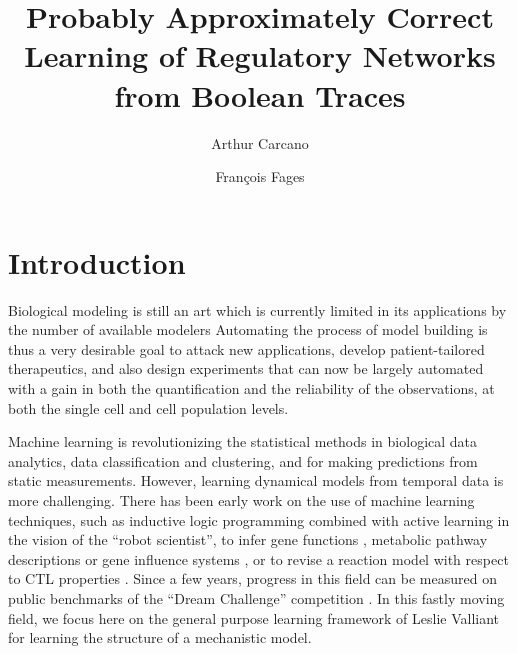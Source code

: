 \documentclass{llncs}
\begin{document}



\title{Probably Approximately Correct Learning of Regulatory Networks from Boolean Traces}

\author{Arthur Carcano \and Fran\c{c}ois Fages}

\maketitle



\begin{abstract}

\end{abstract}

\section{Introduction}


Biological modeling is still an art which is currently limited in its applications by the number of available modelers
Automating the process of model building is thus a very desirable goal
to attack new applications, develop patient-tailored therapeutics,
and also design experiments that can now be largely automated
with a gain in both the quantification and the reliability of the observations, at both the single cell and cell population levels.

Machine learning is revolutionizing the statistical methods in biological data analytics,
data classification and clustering, and for making predictions from static measurements.
However, learning dynamical models from temporal data is more challenging.
There has been early work on the use of machine learning techniques, such as inductive
 logic programming \cite{Muggleton95ngc} combined with active learning in the vision of the ``robot scientist'',
to infer gene functions \cite{BMOKRK01etai},
metabolic pathway descriptions \cite{AM02etai,AM02slps}
or gene influence systems \cite{BCRG04jtb},
or to revise a reaction model with respect to CTL properties \cite{CCFS06tcsb}.
Since a few years, progress in this field can be measured on public benchmarks
of the ``Dream Challenge'' competition \cite{Meyer14bmc}.
In this fastly moving field, we focus here on the general purpose learning framework of Leslie Valliant for learning the structure of a mechanistic model.
\end{document}
